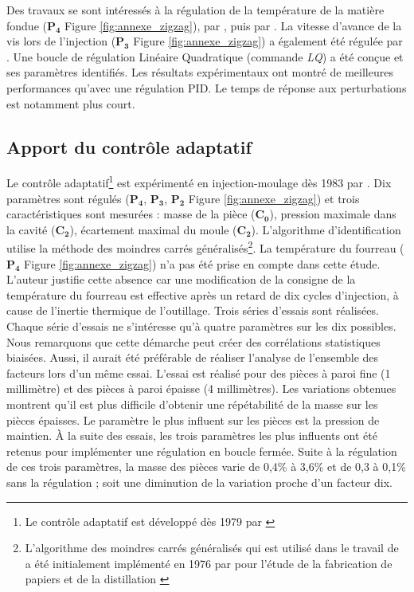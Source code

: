 Des travaux se sont intéressés à la régulation de la température de la matière fondue ($\boldsymbol{P_4}$  Figure \ref{fig:annexe_zigzag}), par \citeauthor{kamal_injection_1986} \cite{kamal_injection_1986, gomes_injection_1986}, puis par \citeauthor{gustafson_model_1987} \cite{gustafson_model_1987}.
La vitesse d’avance de la vis lors de l’injection ($\boldsymbol{P_3}$ Figure \ref{fig:annexe_zigzag}) a également été régulée par \citeauthor{pandelidis_optimal_1988} \cite{pandelidis_optimal_1988}.
Une boucle de régulation Linéaire Quadratique (commande \textit{LQ}) a été conçue et ses paramètres identifiés.
Les résultats expérimentaux ont montré de meilleures performances qu’avec une régulation PID.
Le temps de réponse aux perturbations est notamment plus court.

\subsection{Apport du contrôle adaptatif}
Le contrôle adaptatif\footnote{Le contrôle adaptatif est développé dès 1979 par \citeauthor{landau_adaptive_1979, egardt_stability_1979} \cite{landau_adaptive_1979, egardt_stability_1979}} est expérimenté en injection-moulage dès 1983 par \citeauthor{sanschagrin_process_1983} \cite{sanschagrin_process_1983}.
Dix paramètres sont régulés ($\boldsymbol{P_4}$, $\boldsymbol{P_3}$, $\boldsymbol{P_2}$ Figure \ref{fig:annexe_zigzag}) et trois caractéristiques sont mesurées : masse de la pièce ($\boldsymbol{C_0}$), pression maximale dans la cavité ($\boldsymbol{C_2}$), écartement maximal du moule ($\boldsymbol{C_2}$).
L'algorithme d'identification utilise la méthode des moindres carrés généralisés\footnote{L'algorithme des moindres carrés généralisés qui est utilisé dans le travail de \citeauthor{sanschagrin_process_1983} a été initialement implémenté en 1976 par \citeauthor{bethoux_approche_1976} pour l'étude de la fabrication de papiers et de la distillation \cite{bethoux_approche_1976}}.
La température du fourreau ($\boldsymbol{P_4}$ Figure \ref{fig:annexe_zigzag}) n'a pas été prise en compte dans cette étude.
L'auteur justifie cette absence car une modification de la consigne de la température du fourreau est effective après un retard de dix cycles d’injection, à cause de l'inertie thermique de l'outillage.
Trois séries d'essais sont réalisées.
Chaque série d’essais ne s’intéresse qu’à quatre paramètres sur les dix possibles.
Nous remarquons que cette démarche peut créer des corrélations statistiques biaisées.
Aussi, il aurait été préférable de réaliser l'analyse de l'ensemble des facteurs lors d'un même essai.
L'essai est réalisé pour des pièces à paroi fine (1 millimètre) et des pièces à paroi épaisse (4 millimètres).
Les variations obtenues montrent qu'il est plus difficile d'obtenir une répétabilité de la masse sur les pièces épaisses.
Le paramètre le plus influent sur les pièces est la pression de maintien.
À la suite des essais, les trois paramètres les plus influents ont été retenus pour implémenter une régulation en boucle fermée.
Suite à la régulation de ces trois paramètres, la masse des pièces varie de 0,4\% à 3,6\% et de 0,3 à 0,1\% sans la régulation ; soit une diminution de la variation proche d’un facteur dix.

